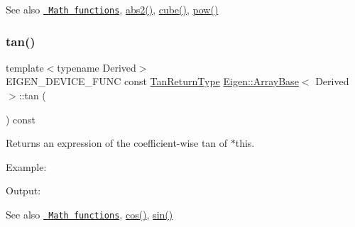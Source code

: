 \begin{DoxySeeAlso}{See also}
\href{group__CoeffwiseMathFunctions.html\#cwisetable_squareE}{\texttt{ Math functions}}, \mbox{\hyperlink{class_eigen_1_1_array_base_ad213e9822777ff03219eed7063c26971}{abs2()}}, \mbox{\hyperlink{class_eigen_1_1_array_base_ab49fda99c455624b18410b9af0be71ec}{cube()}}, \mbox{\hyperlink{class_eigen_1_1_array_base_ab6dc101d82e8228a19a8840e3a29c1c9}{pow()}} 
\end{DoxySeeAlso}
\mbox{\label{class_eigen_1_1_array_base_acc502922cf9aeb43b07b30f250cd1d21}} 
\subsubsection{\texorpdfstring{tan()}{tan()}}
{\footnotesize\ttfamily template$<$typename Derived$>$ \\
E\+I\+G\+E\+N\+\_\+\+D\+E\+V\+I\+C\+E\+\_\+\+F\+U\+NC const \mbox{\hyperlink{class_eigen_1_1_cwise_unary_op}{Tan\+Return\+Type}} \mbox{\hyperlink{class_eigen_1_1_array_base}{Eigen\+::\+Array\+Base}}$<$ Derived $>$\+::tan (\begin{DoxyParamCaption}{ }\end{DoxyParamCaption}) const\hspace{0.3cm}{\ttfamily [inline]}}

\begin{DoxyReturn}{Returns}
an expression of the coefficient-\/wise tan of $\ast$this.
\end{DoxyReturn}
Example\+: 
\begin{DoxyCodeInclude}{0}
\end{DoxyCodeInclude}
 Output\+: 
\begin{DoxyVerbInclude}
\end{DoxyVerbInclude}


\begin{DoxySeeAlso}{See also}
\href{group__CoeffwiseMathFunctions.html\#cwisetable_tan}{\texttt{ Math functions}}, \mbox{\hyperlink{class_eigen_1_1_array_base_abe1bff4421b16e62e75f932b83c4d31f}{cos()}}, \mbox{\hyperlink{class_eigen_1_1_array_base_a8f857f93533ac386282f47c5ef05459a}{sin()}} 
\end{DoxySeeAlso}
\mbox{\label{class_eigen_1_1_array_base_a1e63179878d5a652fef566a67f5b4014}} 
